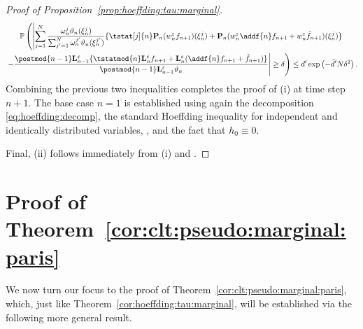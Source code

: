 \begin{proof}[Proof of Proposition~\ref{prop:hoeffding:tau:marginal}]
\begin{multline*}
\pP \left( \left|  \sum_{j = 1}^\N 
\frac{\ewght{n}{j} \adjfuncforward{n}(\epart{n}{j})}{\sum_{j' = 1}^\N \ewght{n}{j'} \adjfuncforward{n}(\epart{n}{j'})} \{ \tstat[j]{n} \prop{n} (\wgtfuncmod{n} f_{n + 1})(\epart{n}{j}) + \prop{n}(\wgtfuncmod{n} \addf{n} f_{n + 1} + \wgtfuncmod{n} \ftd{n + 1})(\epart{n}{j})\} \right. \right. \\
\left. \left. - \frac{\postmod{n - 1} \ukmod{n - 1}\{\tstatmod{n} \ukmod{n} f_{n + 1} + \ukmod{n} (\addf{n} f_{n + 1} + \ftd{n + 1})\}}{\postmod{n - 1} \ukmod{n - 1} \adjfuncforward{n}} \right| \geq \delta \right) \leq d' \exp \left( - \tilde{d}' N \delta^2 \right).  
\end{multline*}
Combining the previous two inequalities completes the proof of (i) at time step $n + 1$. The base case $n = 1$ is established using again the decomposition \eqref{eq:hoeffding:decomp}, the standard Hoeffding inequality for independent and identically distributed variables, \cite[Lemma~4]{douc:garivier:moulines:olsson:2010}, and the fact that $h_0 \equiv 0$.   

Final, (ii) follows immediately from (i) and \cite[Lemma~4]{douc:garivier:moulines:olsson:2010}.
\end{proof} 


\section{Proof of Theorem~\ref{cor:clt:pseudo:marginal:paris}}
\label{sec:proof:prop:clt:pseudo:marginal:paris}

We now turn our focus to the proof of Theorem~\ref{cor:clt:pseudo:marginal:paris}, which, just like Theorem~\ref{cor:hoeffding:tau:marginal}, will be established via the following more general result. 

